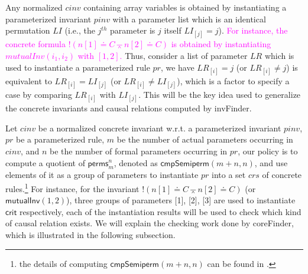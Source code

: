 \documentclass[conference]{IEEEtran}
\def \eqc {\doteq }
\def \andc {\barwedge }
\def \negc {!}
\newcommand\lyj[1]{\textcolor{magenta}{ #1}}
\newcommand{\forget}[1]{}
\begin{document}
Any normalized $cinv$ containing array variables is obtained by instantiating a parameterized invariant $pinv$ with a parameter list which is an identical permutation $LI$ (i.e., the $j^{th}$ parameter is $j$ itself $LI_{[j]}=j$). \lyj{ For instance, the concrete formula $\negc (n[1]\eqc C \andc n[2]\eqc C)$ is obtained by instantiating $mutualInv(i_1,i_2)$ with $[1,2]$.}  Thus, consider a list of parameter $LR$ which is used to instantiate a parameterized rule $pr$, we  have $LR_{[i]}=j$ (or $LR_{[i]}\ne j$) is equivalent to $LR_{[i]}=LI_{[j]}$ (or $LR_{[i]}\ne LI_{[j]}$), %
which is a factor to specify a case by comparing $LR_{[i]}$ with $LI_{[j]}$. This will be the key idea used to  generalize the concrete  invariants and causal relations computed by {\sf invFinder}.  %


Let $cinv$  be a normalized concrete invariant w.r.t. a parameterized invariant $pinv$, $pr$ be a parameterized rule, $m$ be the number of actual parameters occurring in $cinv$, and $n$  be the number of formal parameters occurring in $pr$,  our policy is to compute a quotient of $\mathsf{perms}_{m}^{n}$, denoted as $\mathsf{cmpSemiperm}(m+n,n )$, and use elements of it as a group of parameters to instantiate $pr$ into a set $crs$ of concrete rules.\footnote{the details of computing $\mathsf{cmpSemiperm}(m+n,n )$ can be found in \cite{LiCache16}.}  For instance, for the invariant $\negc (n[1]\eqc C \andc n[2]\eqc C)$ (or $\mathsf{mutualInv}(1,2)$), three groups of parameters [1], [2], [3] are used to instantiate $\mathsf{crit}$ respectively, each of the instantiation results will be used to check which kind of  causal relation exists. We will explain the checking work done by {\sf coreFinder}, which is illustrated in the following subsection. \forget{Each of the three probed concrete causal relations will be used to generalized  into a symbolic causal relation existing between $\mathsf{crit}$ and $\mathsf{mutualInv}$ in a case formulated by a predicate comparing rule parameters and invariant parameters.}   %
\end{document}
